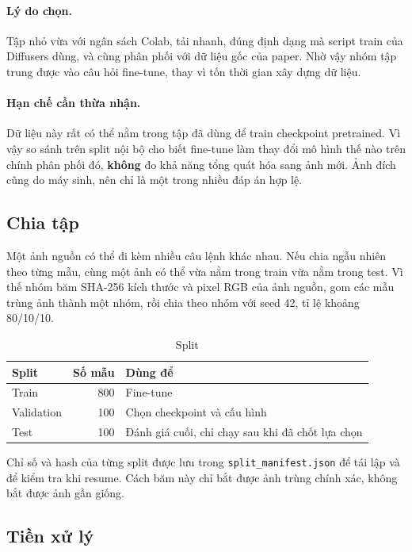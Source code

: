 \documentclass[12pt,a4paper]{article}
\begin{document}
\paragraph{Lý do chọn.} Tập nhỏ vừa với ngân sách Colab, tải nhanh, đúng định dạng mà
script train của Diffusers dùng, và cùng phân phối với dữ liệu gốc của paper. Nhờ vậy
nhóm tập trung được vào câu hỏi fine-tune, thay vì tốn thời gian xây dựng dữ liệu.

\paragraph{Hạn chế cần thừa nhận.} Dữ liệu này rất có thể nằm trong tập đã dùng để
train checkpoint pretrained. Vì vậy so sánh trên split nội bộ cho biết fine-tune làm
thay đổi mô hình thế nào trên chính phân phối đó, \textbf{không} đo khả năng tổng
quát hóa sang ảnh mới. Ảnh đích cũng do máy sinh, nên chỉ là một trong nhiều đáp án
hợp lệ.

\subsection{Chia tập}

Một ảnh nguồn có thể đi kèm nhiều câu lệnh khác nhau. Nếu chia ngẫu nhiên theo từng
mẫu, cùng một ảnh có thể vừa nằm trong train vừa nằm trong test. Vì thế nhóm băm
SHA-256 kích thước và pixel RGB của ảnh nguồn, gom các mẫu trùng ảnh thành một nhóm,
rồi chia theo nhóm với seed 42, tỉ lệ khoảng 80/10/10.

\begin{table}[H]
\centering
\caption{Split}
\begin{tabular}{lrl}
\toprule
Split & Số mẫu & Dùng để \\
\midrule
Train & 800 & Fine-tune \\
Validation & 100 & Chọn checkpoint và cấu hình \\
Test & 100 & Đánh giá cuối, chỉ chạy sau khi đã chốt lựa chọn \\
\bottomrule
\end{tabular}
\end{table}

Chỉ số và hash của từng split được lưu trong \texttt{split\_manifest.json} để tái lập
và để kiểm tra khi resume. Cách băm này chỉ bắt được ảnh trùng chính xác, không bắt
được ảnh gần giống.

\subsection{Tiền xử lý}
\end{document}
